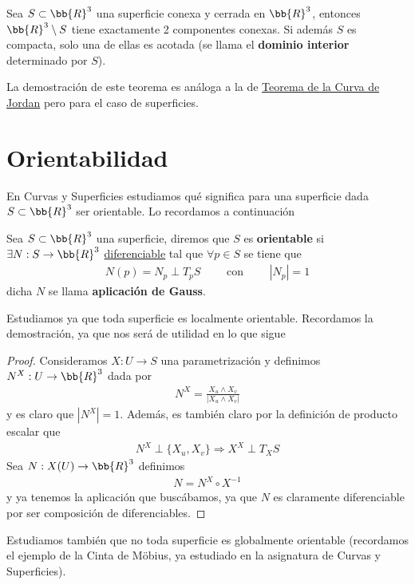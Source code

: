 \begin{teo}\label{teo:sep_jordan_brower}
    Sea $S\subset \bb{R}^3$ una superficie conexa y cerrada en $\bb{R}^3$, entonces $\bb{R}^3 \setminus S$ tiene exactamente 2 componentes conexas. Si además $S$ es compacta, solo una de ellas es acotada (se llama el \textbf{dominio interior} determinado por $S$).
\end{teo}

La demostración de este teorema es análoga a la de \hyperref[teo:curva_jordan]{Teorema de la Curva de Jordan} pero para el caso de superficies.

\section{Orientabilidad}

En Curvas y Superficies estudiamos qué significa para una superficie dada $S\subset \bb{R}^3$ ser orientable. Lo recordamos a continuación

\begin{definicion}
    Sea $S\subset \bb{R}^3$ una superficie, diremos que $S$ es \textbf{orientable} si $\exists N :S \to \bb{R}^3$ \underline{diferenciable} tal que $\forall p\in S$ se tiene que 
    \begin{gather*}
        N(p)=N_p \perp T_pS \qquad \text{ con } \qquad |N_p| = 1
    \end{gather*}
    dicha $N$ se llama \textbf{aplicación de Gauss}.
\end{definicion}

\begin{observacion}
    Estudiamos ya que toda superficie es localmente orientable. Recordamos la demostración, ya que nos será de utilidad en lo que sigue
    \begin{proof}
        Consideramos $X: U \to S$ una parametrización y definimos $N^X : U \to \bb{R}^3$ dada por
        \begin{gather*}
            N^X = \frac{X_u \wedge X_v}{|X_u \wedge X_v|}
        \end{gather*}
        y es claro que $|N^X| = 1$. Además, es también claro por la definición de producto escalar que 
        \begin{gather*}
            N^X \perp \{X_u, X_v\} \Rightarrow X^X \perp T_XS
        \end{gather*}
        Sea $N:X(U) \to \bb{R}^3$ definimos
        \begin{gather*}
            N = N^X \circ X^{-1}
        \end{gather*}
        y ya tenemos la aplicación que buscábamos, ya que $N$ es claramente diferenciable por ser composición de diferenciables.
    \end{proof}
    Estudiamos también que no toda superficie es globalmente orientable (recordamos el ejemplo de la Cinta de Möbius, ya estudiado en la asignatura de Curvas y Superficies).
\end{observacion}

